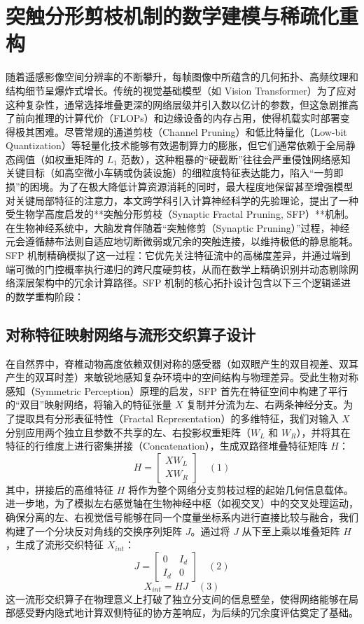 \section{突触分形剪枝机制的数学建模与稀疏化重构}
随着遥感影像空间分辨率的不断攀升，每帧图像中所蕴含的几何拓扑、高频纹理和结构细节呈爆炸式增长。传统的视觉基础模型（如 Vision Transformer）为了应对这种复杂性，通常选择堆叠更深的网络层级并引入数以亿计的参数，但这急剧推高了前向推理的计算代价（FLOPs）和边缘设备的内存占用，使得机载实时部署变得极其困难。尽管常规的通道剪枝（Channel Pruning）和低比特量化（Low-bit Quantization）等轻量化技术能够有效遏制算力的膨胀，但它们通常依赖于全局静态阈值（如权重矩阵的 $L_1$ 范数），这种粗暴的“硬截断”往往会严重侵蚀网络感知关键目标（如高空微小车辆或伪装设施）的细粒度特征表达能力，陷入“一剪即损”的困境。为了在极大降低计算资源消耗的同时，最大程度地保留甚至增强模型对关键局部特征的注意力，本文跨学科引入计算神经科学的先验理论，提出了一种受生物学高度启发的**突触分形剪枝（Synaptic Fractal Pruning, SFP）**机制。在生物神经系统中，大脑发育伴随着“突触修剪（Synaptic Pruning）”过程，神经元会遵循赫布法则自适应地切断微弱或冗余的突触连接，以维持极低的静息能耗。SFP 机制精确模拟了这一过程：它优先关注特征流中的高梯度差异，并通过端到端可微的门控概率执行递归的跨尺度硬剪枝，从而在数学上精确识别并动态剔除网络深层架构中的冗余计算路径。SFP 机制的核心拓扑设计包含以下三个逻辑递进的数学重构阶段：

\subsection{对称特征映射网络与流形交织算子设计}
在自然界中，脊椎动物高度依赖双侧对称的感受器（如双眼产生的双目视差、双耳产生的双耳时差）来敏锐地感知复杂环境中的空间结构与物理差异。受此生物对称感知（Symmetric Perception）原理的启发，SFP 首先在特征空间中构建了平行的“双目”映射网络，将输入的特征张量 $X$ 复制并分流为左、右两条神经分支。为了提取具有分形表征特性（Fractal Representation）的多维特征，我们对输入 $X$ 分别应用两个独立且参数不共享的左、右投影权重矩阵（$W_L$ 和 $W_R$），并将其在特征的行维度上进行密集拼接（Concatenation），生成双路径堆叠特征矩阵 $H$：$$H = \begin{bmatrix} XW_L \\ XW_R \end{bmatrix} \quad (1)$$其中，拼接后的高维特征 $H$ 将作为整个网络分支剪枝过程的起始几何信息载体。进一步地，为了模拟左右感觉轴在生物神经中枢（如视交叉）中的交叉处理运动，确保分离的左、右视觉信号能够在同一个度量坐标系内进行直接比较与融合，我们构建了一个分块反对角线的交换序列矩阵 $J$。通过将 $J$ 从下至上乘以堆叠矩阵 $H$，生成了流形交织特征 $X_{int}$：$$J = \begin{bmatrix} 0 & I_d \\ I_d & 0 \end{bmatrix} \quad (2)$$$$X_{int} = HJ \quad (3)$$这一流形交织算子在物理意义上打破了独立分支间的信息壁垒，使得网络能够在局部感受野内隐式地计算双侧特征的协方差响应，为后续的冗余度评估奠定了基础。

